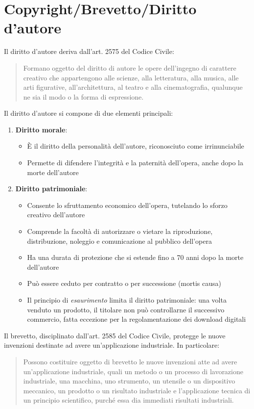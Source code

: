 \documentclass[8pt,oneside,a4paper]{article}
\begin{document}
	\section{Copyright/Brevetto/Diritto d'autore}
	Il diritto d'autore deriva dall'art. 2575 del Codice Civile:
	\begin{quote}
		Formano oggetto del diritto di autore le opere dell'ingegno di carattere creativo che appartengono alle scienze, alla letteratura, alla musica, alle arti figurative, all'architettura, al teatro e alla cinematografia, qualunque ne sia il modo o la forma di espressione.
	\end{quote}
	Il diritto d'autore si compone di due elementi principali:
	\begin{enumerate}
		\item \textbf{Diritto morale}:  
		\begin{itemize}
			\item È il diritto della personalità dell'autore, riconosciuto come irrinunciabile
			\item Permette di difendere l'integrità e la paternità dell'opera, anche dopo la morte dell'autore
		\end{itemize}
		\item \textbf{Diritto patrimoniale}:  
		\begin{itemize}
			\item Consente lo sfruttamento economico dell'opera, tutelando lo sforzo creativo dell'autore
			\item Comprende la facoltà di autorizzare o vietare la riproduzione, distribuzione, noleggio e comunicazione al pubblico dell'opera
			\item Ha una durata di protezione che si estende fino a 70 anni dopo la morte dell'autore
			\item Può essere ceduto per contratto o per successione (mortis causa)
			\item Il principio di \textit{esaurimento} limita il diritto patrimoniale: una volta venduto un prodotto, il titolare non può controllarne il successivo commercio, fatta eccezione per la regolamentazione dei download digitali
		\end{itemize}
	\end{enumerate}
	Il brevetto, disciplinato dall'art. 2585 del Codice Civile, protegge le nuove invenzioni destinate ad avere un'applicazione industriale. In particolare:
	\begin{quote}
		Possono costituire oggetto di brevetto le nuove invenzioni atte ad avere un'applicazione industriale, quali un metodo o un processo di lavorazione industriale, una macchina, uno strumento, un utensile o un dispositivo meccanico, un prodotto o un risultato industriale e l'applicazione tecnica di un principio scientifico, purché essa dia immediati risultati industriali.
	\end{quote}
\end{document}
